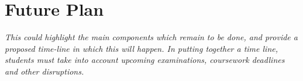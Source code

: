 \chapter{Future Plan}\label{C:fut} 

\textit{This could highlight the main components which remain to be done, and provide a proposed time-line in which this will happen. In putting together a time line, students must take into account upcoming examinations, coursework deadlines and other disruptions. }